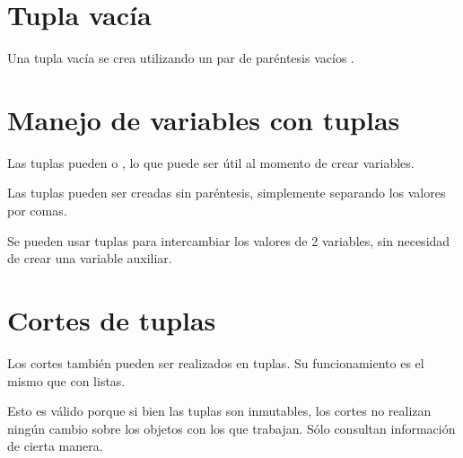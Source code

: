 \section{Tupla vacía}

Una tupla vacía se crea utilizando un par de paréntesis vacíos \ttt{()}.


\section{Manejo de variables con tuplas}

Las tuplas pueden  o , lo que puede ser útil al momento de crear variables.


Las tuplas pueden ser creadas sin paréntesis, simplemente separando los valores por comas.


Se pueden usar tuplas para intercambiar los valores de 2 variables, sin necesidad de crear una variable auxiliar.


\section{Cortes de tuplas}

Los cortes también pueden ser realizados en tuplas.
Su funcionamiento es el mismo que con listas.


Esto es válido porque si bien las tuplas son inmutables, los cortes no realizan ningún cambio sobre los objetos con los que trabajan.
Sólo consultan información de cierta manera.

\clearpage